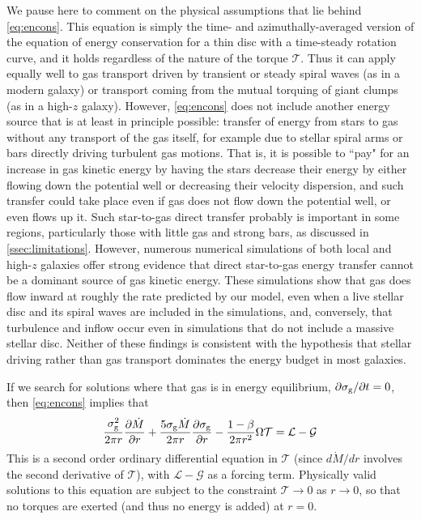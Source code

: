 \documentclass[useAMS,usenatbib]{mn2e}
\newcommand{\calL}{\mathcal{L}}
\newcommand{\calG}{\mathcal{G}}
\newcommand{\calT}{\mathcal{T}}
\begin{document}
We pause here to comment on the physical assumptions that lie behind \autoref{eq:encons}. This equation is simply the time- and azimuthally-averaged version of the equation of energy conservation for a thin disc with a time-steady rotation curve, and it holds regardless of the nature of the torque $\mathcal{T}$. Thus it can apply equally well to gas transport driven by transient or steady spiral waves (as in a modern galaxy) or transport coming from the mutual torquing of giant clumps (as in a high-$z$ galaxy). However, \autoref{eq:encons} does not include another energy source that is at least in principle possible: transfer of energy from stars to gas without any transport of the gas itself, for example due to stellar spiral arms or bars directly driving turbulent gas motions. That is, it is possible to ``pay" for an increase in gas kinetic energy by having the stars decrease their energy by either flowing down the potential well or decreasing their velocity dispersion, and such transfer could take place even if gas does not flow down the potential well, or even flows up it. Such star-to-gas direct transfer probably is important in some regions, particularly those with little gas and strong bars, as discussed in \autoref{ssec:limitations}. However, numerous numerical simulations of both local \citep{agertz09b, goldbaum15a, goldbaum16a} and high-$z$ \citep{bournaud07a, bournaud09a, ceverino10a} galaxies offer strong evidence that direct star-to-gas energy transfer cannot be a dominant source of gas kinetic energy. These simulations show that gas does flow inward at roughly the rate predicted by our model, even when a live stellar disc and its spiral waves are included in the simulations, and, conversely, that turbulence and inflow occur even in simulations that do not include a massive stellar disc. Neither of these findings is consistent with the hypothesis that stellar driving rather than gas transport dominates the energy budget in most galaxies.

If we search for solutions where that gas is in energy equilibrium, $\partial\sigma_{\rm g}/\partial t = 0$, then \autoref{eq:encons} implies that
\begin{equation}
\label{eq:eneq}
\frac{\sigma_{\rm g}^2}{2\pi r} \frac{\partial \dot{M}}{\partial r} + \frac{5 \sigma_{\rm g} \dot{M}}{2\pi r}  \frac{\partial \sigma_{\rm g}}{\partial r} - \frac{1-\beta}{2\pi r^2} \Omega \calT = \calL - \calG
\end{equation}
This is a second order ordinary differential equation in $\calT$ (since $d\dot{M}/dr$ involves the second derivative of $\calT$), with $\calL - \calG$ as a forcing term. Physically valid solutions to this equation are subject to the constraint $\calT \rightarrow 0$ as $r\rightarrow 0$, so that no torques are exerted (and thus no energy is added) at $r=0$.
\end{document}
